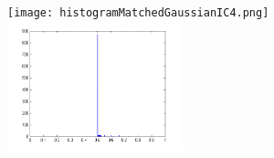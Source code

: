 \documentclass{InsightArticle}
\begin{document}
\begin{figure}
\center
\texttt{[image: histogramMatchedGaussianIC4.png]}
\includegraphics[width=0.45\textwidth]{outputHistogram.png}
\label{fig:OutputMesh}
\end{figure}

\clearpage

%
%



\end{document}
